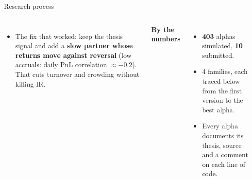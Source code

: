 \documentclass[aspectratio=169,10pt]{beamer}
\begin{document}
\begin{frame}{Research process}
\begin{columns}[T]
\begin{itemize}
\item The fix that worked: keep the thesis signal and add a \textbf{slow partner whose returns move against reversal} (low accruals: daily PnL correlation $\approx -0.2$). That cuts turnover and crowding without killing IR.
\end{itemize}
\textbf{\small By the numbers}
\footnotesize
\begin{itemize}
\item \textbf{403} alphas simulated, \textbf{10} submitted.
\item 4 families, each traced below from the first version to the best alpha.
\item Every alpha documents its thesis, source and a comment on each line of code.
\end{itemize}
\end{columns}
\end{frame}
\end{document}
